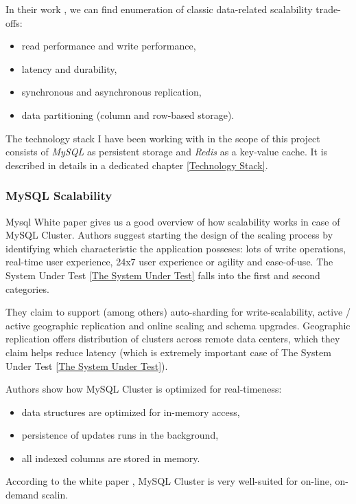 \documentclass{uvamscse}
\begin{document}
In their work \cite{Ycsb}, we can find enumeration of classic data-related scalability trade-offs:
\begin{itemize}
    \item read performance and write performance,
    \item latency and durability,
    \item synchronous and asynchronous replication,
    \item data partitioning (column and row-based storage).
  \end{itemize}


The technology stack I have been working with in the scope of this project consists of \textit{MySQL} as persistent storage and \textit{Redis} as a key-value cache. It is described in details in a dedicated chapter \ref{Technology Stack}.

\subsubsection{MySQL Scalability}

Mysql White paper \cite{MySQL} gives us a good overview of how scalability works in case of MySQL Cluster. Authors suggest starting the design of the scaling process by identifying which characteristic the application posseses: lots of write operations, real-time user experience, 24x7 user experience or agility and ease-of-use. The System Under Test \ref{The System Under Test} falls into the first and second categories.

They claim to support (among others) auto-sharding for write-scalability, active / active geographic replication and online scaling and schema upgrades.  Geographic replication offers distribution of clusters across remote data centers, which they claim helps reduce latency (which is extremely important case of The System Under Test \ref{The System Under Test}).

Authors show how MySQL Cluster is optimized for real-timeness:
\begin{itemize}
  \item data structures are optimized for in-memory access,
  \item persistence of updates runs in the background,
  \item all indexed columns are stored in memory.
\end{itemize}
According to the white paper \cite{MySQL}, MySQL Cluster is very well-suited for on-line, on-demand scalin.
\end{document}

